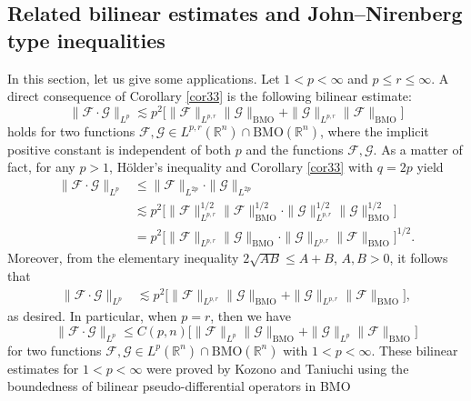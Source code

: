\documentclass{birkjour}
\theoremstyle{definition}
\theoremstyle{remark}
\numberwithin{equation}{section}
\begin{document}
\subsection{Related bilinear estimates and John--Nirenberg type inequalities}
In this section, let us give some applications. Let $1<p<\infty$ and $p\leq r\leq\infty$. A direct consequence of Corollary \ref{cor33} is the following bilinear estimate:
\begin{equation}\label{bilinear1}
\|\mathcal{F}\cdot \mathcal{G}\|_{L^{p}}\lesssim p^2
\Big[\|\mathcal{F}\|_{L^{p,r}}\|\mathcal{G}\|_{\mathrm{BMO}}+\|\mathcal{G}\|_{L^{p,r}}\|\mathcal{F}\|_{\mathrm{BMO}}\Big]
\end{equation}
holds for two functions $\mathcal{F},\mathcal{G}\in L^{p,r}(\mathbb R^n)\cap \mathrm{BMO}(\mathbb R^n)$, where the implicit positive constant is independent of both $p$ and the functions $\mathcal{F},\mathcal{G}$. As a matter of fact, for any $p>1$, H\"{o}lder's inequality and Corollary \ref{cor33} with $q=2p$ yield
\begin{equation*}
\begin{split}
\|\mathcal{F}\cdot \mathcal{G}\|_{L^{p}}&\leq\|\mathcal{F}\|_{L^{2p}}\cdot\|\mathcal{G}\|_{L^{2p}}\\
&\lesssim p^2\Big[\|\mathcal{F}\|^{1/2}_{L^{p,r}}\|\mathcal{F}\|^{1/2}_{\mathrm{BMO}}
\cdot\|\mathcal{G}\|^{1/2}_{L^{p,r}}\|\mathcal{G}\|^{1/2}_{\mathrm{BMO}}\Big]\\
&=p^2\Big[\|\mathcal{F}\|_{L^{p,r}}\|\mathcal{G}\|_{\mathrm{BMO}}
\cdot\|\mathcal{G}\|_{L^{p,r}}\|\mathcal{F}\|_{\mathrm{BMO}}\Big]^{1/2}.
\end{split}
\end{equation*}
Moreover, from the elementary inequality $2\sqrt{AB}\leq A+B$, $A,B>0$, it follows that
\begin{equation*}
\begin{split}
\|\mathcal{F}\cdot \mathcal{G}\|_{L^{p}}
&\lesssim p^2\Big[\|\mathcal{F}\|_{L^{p,r}}\|\mathcal{G}\|_{\mathrm{BMO}}+\|\mathcal{G}\|_{L^{p,r}}\|\mathcal{F}\|_{\mathrm{BMO}}\Big],
\end{split}
\end{equation*}
as desired. In particular, when $p=r$, then we have
\begin{equation*}
\|\mathcal{F}\cdot \mathcal{G}\|_{L^{p}}\leq C(p,n)
\Big[\|\mathcal{F}\|_{L^{p}}\|\mathcal{G}\|_{\mathrm{BMO}}+\|\mathcal{G}\|_{L^{p}}\|\mathcal{F}\|_{\mathrm{BMO}}\Big]
\end{equation*}
for two functions $\mathcal{F},\mathcal{G}\in L^{p}(\mathbb R^n)\cap \mathrm{BMO}(\mathbb R^n)$ with $1<p<\infty$. These bilinear estimates for $1<p<\infty$ were proved by Kozono and Taniuchi using the boundedness of bilinear pseudo-differential operators in BMO
\end{document}
